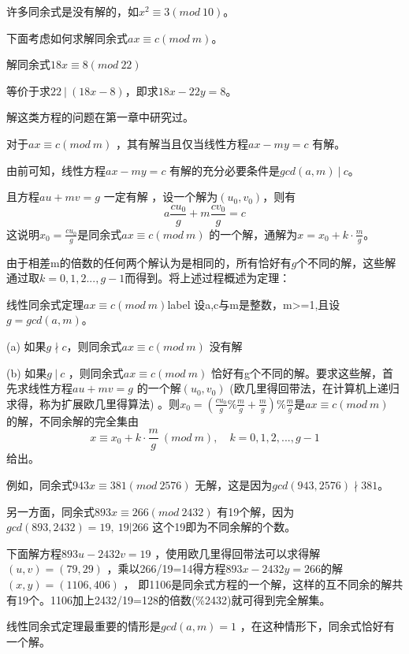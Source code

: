 许多同余式是没有解的，如$x^2\equiv 3(mod\ 10)$。

\vbox{}

下面考虑如何求解同余式$ax\equiv c(mod\ m)$。 
\begin{example}
解同余式$18x\equiv8(mod\ 22)$
\end{example}

等价于求$22\ |\ (18x-8)$，即求$18x-22y=8$。       

解这类方程的问题在第一章中研究过。

对于$ax\equiv c(mod\ m)$ ，其有解{\heiti 当且仅当}线性方程$ax-my=c$ 有解。


由前可知，线性方程$ax-my=c$ 有解的充分必要条件是$gcd(a,m)\ |\ c$。

且方程$au+mv=g$ 一定有解 ，设一个解为$(u_0,v_0)$，则有
$$
a\frac{cu_0}{g}+m\frac{cv_0}{g}=c
$$
这说明$x_0= \frac{cu_0}{g}$是同余式$ax\equiv c(mod\ m)$ 的一个解，通解为$x=x_0+k\cdot \frac{m}{g}$。

{\heiti 由于相差m的倍数的任何两个解认为是相同的}，所有恰好有$g$个不同的解，这些解通过取$k=0,1,2...,g-1$而得到。将上述过程概述为定理：


\begin{theorem}{线性同余式定理$ax\equiv c(mod\ m)$}{label}
设a,c与m是整数，m>=1,且设$g=gcd(a,m)$。 

(a)  如果$g\nmid c$，则同余式$ax\equiv c(mod\ m)$ 没有解

(b)  如果$g\ |\ c$ ，则同余式$ax\equiv c(mod\ m)$ 恰好有g个不同的解。要求这些解，首先求线性方程$au+mv=g$ 的一个解$(u_0,v_0)$ 
{\heiti (欧几里得回带法，在计算机上递归求得，称为扩展欧几里得算法)} 。则$x_0=(\frac{cu_0}{g}\% \frac{m}{g} + \frac{m}{g}) \% \frac{m}{g}$是$ax\equiv c(mod\ m)$ 的解，不同余解的完全集由
$$
x\equiv x_0+k\cdot \frac{m}{g} \  (mod\ m),\quad k=0,1,2,...,g-1
$$
给出。
\end{theorem}


例如，同余式$943x\equiv 381(mod\ 2576)$ 无解，这是因为$gcd(943,2576) \nmid 381$。

另一方面，同余式$893x\equiv 266(mod\ 2432) $
有19个解，因为$gcd(893,2432)=19,\  19|266$     这个19即为不同余解的个数。

下面解方程$893u-2432v=19$ ，使用欧几里得回带法可以求得解$(u,v)=(79,29)$ ，乘以266/19=14得方程$893x-2432y=266$的解$(x,y)=(1106,406)$ ，
即1106是同余式方程的一个解，这样的互不同余的解共有19个。1106加上2432/19=128的倍数(\%2432)就可得到完全解集。


\begin{remark}
	线性同余式定理最重要的情形是$gcd(a,m)=1$ ，在这种情形下，同余式恰好有一个解。
\end{remark}

